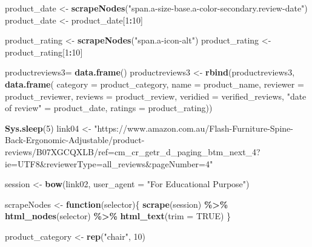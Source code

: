 \documentclass[
]{article}
\newenvironment{Shaded}{\begin{snugshade}}{\end{snugshade}}
\newcommand{\AttributeTok}[1]{\textcolor[rgb]{0.13,0.29,0.53}{#1}}
\newcommand{\ConstantTok}[1]{\textcolor[rgb]{0.56,0.35,0.01}{#1}}
\newcommand{\ControlFlowTok}[1]{\textcolor[rgb]{0.13,0.29,0.53}{\textbf{#1}}}
\newcommand{\DecValTok}[1]{\textcolor[rgb]{0.00,0.00,0.81}{#1}}
\newcommand{\FunctionTok}[1]{\textcolor[rgb]{0.13,0.29,0.53}{\textbf{#1}}}
\newcommand{\NormalTok}[1]{#1}
\newcommand{\OtherTok}[1]{\textcolor[rgb]{0.56,0.35,0.01}{#1}}
\newcommand{\SpecialCharTok}[1]{\textcolor[rgb]{0.81,0.36,0.00}{\textbf{#1}}}
\newcommand{\StringTok}[1]{\textcolor[rgb]{0.31,0.60,0.02}{#1}}
\begin{document}
\begin{Shaded}
\begin{Highlighting}[]
\NormalTok{  product\_date }\OtherTok{\textless{}{-}} \FunctionTok{scrapeNodes}\NormalTok{(}\StringTok{"span.a{-}size{-}base.a{-}color{-}secondary.review{-}date"}\NormalTok{)}
\NormalTok{  product\_date }\OtherTok{\textless{}{-}}\NormalTok{ product\_date[}\DecValTok{1}\SpecialCharTok{:}\DecValTok{10}\NormalTok{]}
  
\NormalTok{  product\_rating }\OtherTok{\textless{}{-}} \FunctionTok{scrapeNodes}\NormalTok{(}\StringTok{"span.a{-}icon{-}alt"}\NormalTok{)}
\NormalTok{  product\_rating }\OtherTok{\textless{}{-}}\NormalTok{ product\_rating[}\DecValTok{1}\SpecialCharTok{:}\DecValTok{10}\NormalTok{]}
  
\NormalTok{  productreviews3}\OtherTok{=} \FunctionTok{data.frame}\NormalTok{()}
\NormalTok{  productreviews3 }\OtherTok{\textless{}{-}} \FunctionTok{rbind}\NormalTok{(productreviews3, }\FunctionTok{data.frame}\NormalTok{(}
                      \AttributeTok{category =}\NormalTok{ product\_category,}
                      \AttributeTok{name =}\NormalTok{ product\_name,}
                      \AttributeTok{reviewer =}\NormalTok{ product\_reviewer,}
                      \AttributeTok{reviews =}\NormalTok{ product\_review,}
                      \AttributeTok{veridied =}\NormalTok{ verified\_reviews,}
                      \StringTok{"date of review"} \OtherTok{=}\NormalTok{ product\_date,}
                      \AttributeTok{ratings =}\NormalTok{ product\_rating))}
  
   \FunctionTok{Sys.sleep}\NormalTok{(}\DecValTok{5}\NormalTok{)}
\NormalTok{link04 }\OtherTok{\textless{}{-}} \StringTok{"https://www.amazon.com.au/Flash{-}Furniture{-}Spine{-}Back{-}Ergonomic{-}Adjustable/product{-}reviews/B07XGCQXLB/ref=cm\_cr\_getr\_d\_paging\_btm\_next\_4?ie=UTF8\&reviewerType=all\_reviews\&pageNumber=4"}


\NormalTok{  session }\OtherTok{\textless{}{-}} \FunctionTok{bow}\NormalTok{(link02,}
               \AttributeTok{user\_agent =} \StringTok{"For Educational Purpose"}\NormalTok{)}

\NormalTok{  scrapeNodes }\OtherTok{\textless{}{-}} \ControlFlowTok{function}\NormalTok{(selector)\{}
    \FunctionTok{scrape}\NormalTok{(session) }\SpecialCharTok{\%\textgreater{}\%}
      \FunctionTok{html\_nodes}\NormalTok{(selector) }\SpecialCharTok{\%\textgreater{}\%}
      \FunctionTok{html\_text}\NormalTok{(}\AttributeTok{trim =} \ConstantTok{TRUE}\NormalTok{)}
\NormalTok{  \}}

\NormalTok{  product\_category }\OtherTok{\textless{}{-}} \FunctionTok{rep}\NormalTok{(}\StringTok{"chair"}\NormalTok{, }\DecValTok{10}\NormalTok{)}


\end{Highlighting}
\end{Shaded}
\end{document}
